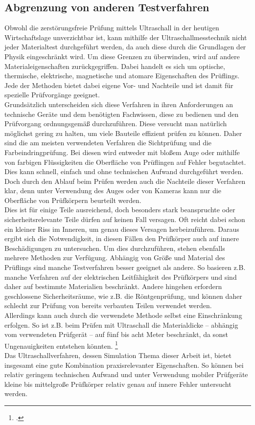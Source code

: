 \documentclass[reducespace,stylepage,semiarbeit]{spezidoc}
\begin{document}
\subsection{Abgrenzung von anderen Testverfahren}

Obwohl die zerstörungsfreie Prüfung mittels Ultraschall in der heutigen Wirtschaftslage unverzichtbar ist, kann mithilfe der Ultraschallmesstechnik nicht jeder Materialtest durchgeführt werden, da auch diese durch die Grundlagen der Physik eingeschränkt wird.
Um diese Grenzen zu überwinden, wird auf andere Materialeigenschaften zurückgegriffen.
Dabei handelt es sich um optische, thermische, elektrische, magnetische und atomare Eigenschaften des Prüflings. 
Jede der Methoden bietet dabei eigene Vor- und Nachteile und ist damit für spezielle Prüfvorgänge geeignet. \\ 
Grundsätzlich unterscheiden sich diese Verfahren in ihren Anforderungen an technische Geräte und dem benötigten Fachwissen, diese zu bedienen und den Prüfvorgang ordnungsgemäß durchzuführen. 
Diese versucht man natürlich möglichst gering zu halten, um viele Bauteile effizient prüfen zu können.
Daher sind die am meisten verwendeten Verfahren die Sichtprüfung und die Farbeindringprüfung. 
Bei diesen wird entweder mit bloßem Auge oder mithilfe von farbigen Flüssigkeiten die Oberfläche von Prüflingen auf Fehler begutachtet. 
Dies kann schnell, einfach und ohne technischen Aufwand durchgeführt werden.
Doch durch den Ablauf beim Prüfen werden auch die Nachteile dieser Verfahren klar, denn unter Verwendung des Auges oder von Kameras kann nur die Oberfläche von Prüfkörpern beurteilt werden. \\
Dies ist für einige Teile ausreichend, doch besonders stark beanspruchte oder sicherheitsrelevante Teile dürfen auf keinen Fall versagen. 
Oft reicht dabei schon ein kleiner Riss im Inneren, um genau dieses Versagen herbeizuführen. 
Daraus ergibt sich die Notwendigkeit, in diesen Fällen den Prüfkörper auch auf innere Beschädigungen zu untersuchen.
Um dies durchzuführen, stehen ebenfalls mehrere Methoden zur Verfügung.
Abhängig von Größe und Material des Prüflings sind manche Testverfahren besser geeignet als andere. 
So basieren z.B. manche Verfahren auf der elektrischen Leitfähigkeit des Prüfkörpers und sind daher auf bestimmte Materialien beschränkt.
Andere hingehen erfordern geschlossene Sicherheitsräume, wie z.B. die Röntgenprüfung, und können daher schlecht zur Prüfung von bereits verbauten Teilen verwendet werden.\\
Allerdings kann auch durch die verwendete Methode selbst eine Einschränkung erfolgen. So ist z.B. beim Prüfen mit Ultraschall die Materialdicke -- abhängig vom verwendeten Prüfgerät -- auf fünf bis acht Meter beschränkt, da sonst Ungenauigkeiten entstehen könnten. \footcite{ultraschall} \\ 
Das Ultraschallverfahren, dessen Simulation Thema dieser Arbeit ist, bietet insgesamt eine gute Kombination praxisrelevanter
 Eigenschaften. So können bei relativ geringem technischen Aufwand und unter Verwendung mobiler Prüfgeräte kleine bis mittelgroße Prüfkörper relativ genau auf innere Fehler untersucht werden.
\end{document}
